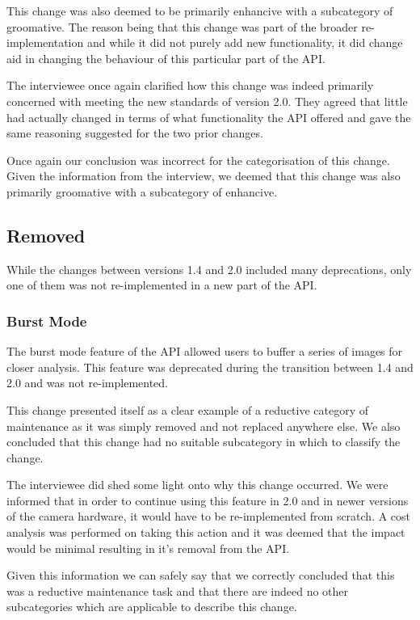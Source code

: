 \documentclass{sig-alternate}
\begin{document}
This change was also deemed to be primarily enhancive with a subcategory of groomative. The reason being that this change was part of the broader re-implementation and while it did not purely add new functionality, it did change aid in changing the behaviour of this particular part of the API.

The interviewee once again clarified how this change was indeed primarily concerned with meeting the new standards of version 2.0. They agreed that little had actually changed in terms of what functionality the API offered and gave the same reasoning suggested for the two prior changes.

Once again our conclusion was incorrect for the categorisation of this change. Given the information from the interview, we deemed that this change was also primarily groomative with a subcategory of enhancive.

\subsection{Removed}

While the changes between versions 1.4 and 2.0 included many deprecations, only one of them was not re-implemented in a new part of the API. 
\subsubsection{Burst Mode}

The burst mode feature of the API allowed users to buffer a series of images for closer analysis. This feature was deprecated during the transition between 1.4 and 2.0 and was not re-implemented.

This change presented itself as a clear example of a reductive category of maintenance as it was simply removed and not replaced anywhere else. We also concluded that this change had no suitable subcategory in which to classify the change.

The interviewee did shed some light onto why this change occurred. We were informed that in order to continue using this feature in 2.0 and in newer versions of the camera hardware, it would have to be re-implemented from scratch. A cost analysis was performed on taking this action and it was deemed that the impact would be minimal resulting in it's removal from the API.

Given this information we can safely say that we correctly concluded that this was a reductive maintenance task and that there are indeed no other subcategories which are applicable to describe this change.
\end{document}
